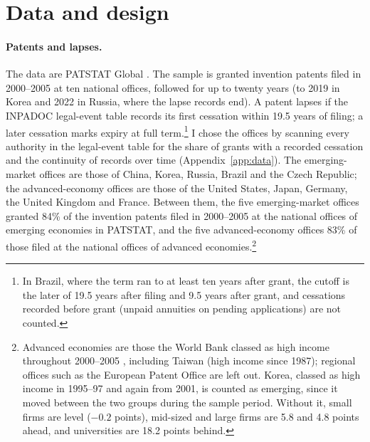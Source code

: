\section{Data and design}\label{sec:data}

\paragraph{Patents and lapses.} The data are PATSTAT Global \citep[autumn 2025 edition;][]{PATSTAT}. The sample is
granted invention patents filed in 2000--2005 at ten national offices, followed for up to twenty years (to 2019 in Korea and 2022 in Russia, where the
lapse records end). A patent
lapses if the INPADOC legal-event table records its first cessation within 19.5 years of filing; a later cessation
marks expiry at full term.\footnote{In Brazil, where the term ran to at least ten years after grant, the cutoff is the
later of 19.5 years after filing and 9.5 years after grant, and cessations recorded before grant (unpaid annuities on
pending applications) are not counted.} I chose the offices by scanning every authority in the legal-event table for the share of
grants with a recorded cessation and the continuity of records over time (Appendix~\ref{app:data}). The
emerging-market offices are those of China, Korea, Russia, Brazil and the Czech Republic; the advanced-economy
offices are those of the United States, Japan, Germany, the United Kingdom and France. Between them, the five
emerging-market offices granted 84\% of the invention patents filed in 2000--2005 at the national offices of
emerging economies in PATSTAT, and the five advanced-economy offices 83\% of those filed at the national offices of
advanced economies.\footnote{Advanced economies are those the World Bank classed as high income throughout 2000--2005
\citep{WBincome}, including Taiwan (high income since 1987); regional offices such as the European Patent Office are
left out. Korea, classed as high income in 1995--97 and again from 2001, is counted as emerging, since it moved
between the two groups during the sample period. Without it, small firms are level ($-0.2$ points), mid-sized and large firms are 5.8 and 4.8 points
ahead, and universities are 18.2 points behind.}

